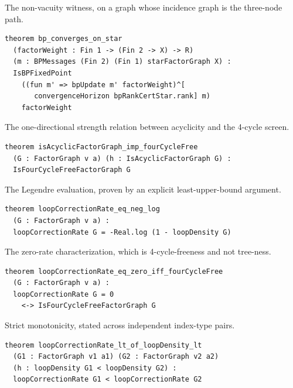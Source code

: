 \documentclass[aps,prx,reprint,nofootinbib,floatfix]{revtex4-2}
\begin{document}
The non-vacuity witness, on a graph whose incidence graph is the three-node path.

{\footnotesize
\begin{lstlisting}[basicstyle=\ttfamily,columns=fullflexible,keepspaces=true,showstringspaces=false,breaklines=true,breakatwhitespace=true,breakindent=1em]
theorem bp_converges_on_star
  (factorWeight : Fin 1 -> (Fin 2 -> X) -> R)
  (m : BPMessages (Fin 2) (Fin 1) starFactorGraph X) :
  IsBPFixedPoint
    ((fun m' => bpUpdate m' factorWeight)^[
       convergenceHorizon bpRankCertStar.rank] m)
    factorWeight
\end{lstlisting}
}

The one-directional strength relation between acyclicity and the 4-cycle screen.

{\footnotesize
\begin{lstlisting}[basicstyle=\ttfamily,columns=fullflexible,keepspaces=true,showstringspaces=false,breaklines=true,breakatwhitespace=true,breakindent=1em]
theorem isAcyclicFactorGraph_imp_fourCycleFree
  (G : FactorGraph v a) (h : IsAcyclicFactorGraph G) :
  IsFourCycleFreeFactorGraph G
\end{lstlisting}
}

The Legendre evaluation, proven by an explicit least-upper-bound argument.

{\footnotesize
\begin{lstlisting}[basicstyle=\ttfamily,columns=fullflexible,keepspaces=true,showstringspaces=false,breaklines=true,breakatwhitespace=true,breakindent=1em]
theorem loopCorrectionRate_eq_neg_log
  (G : FactorGraph v a) :
  loopCorrectionRate G = -Real.log (1 - loopDensity G)
\end{lstlisting}
}

The zero-rate characterization, which is 4-cycle-freeness and not tree-ness.

{\footnotesize
\begin{lstlisting}[basicstyle=\ttfamily,columns=fullflexible,keepspaces=true,showstringspaces=false,breaklines=true,breakatwhitespace=true,breakindent=1em]
theorem loopCorrectionRate_eq_zero_iff_fourCycleFree
  (G : FactorGraph v a) :
  loopCorrectionRate G = 0
    <-> IsFourCycleFreeFactorGraph G
\end{lstlisting}
}

Strict monotonicity, stated across independent index-type pairs.

{\footnotesize
\begin{lstlisting}[basicstyle=\ttfamily,columns=fullflexible,keepspaces=true,showstringspaces=false,breaklines=true,breakatwhitespace=true,breakindent=1em]
theorem loopCorrectionRate_lt_of_loopDensity_lt
  (G1 : FactorGraph v1 a1) (G2 : FactorGraph v2 a2)
  (h : loopDensity G1 < loopDensity G2) :
  loopCorrectionRate G1 < loopCorrectionRate G2
\end{lstlisting}
}
\end{document}
